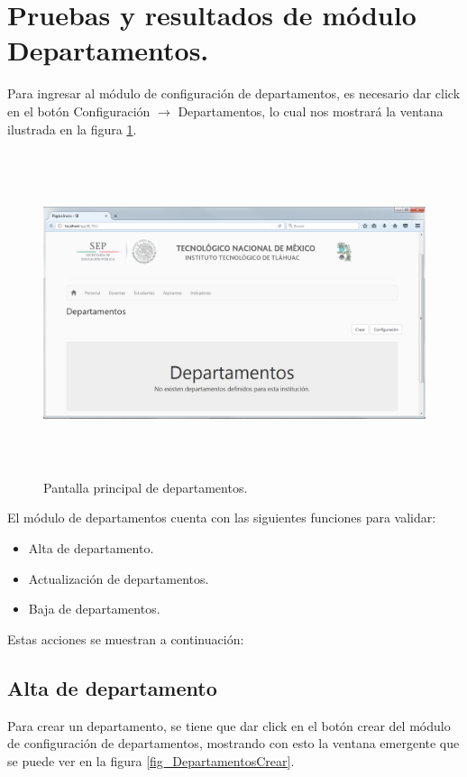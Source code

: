 		\section{Pruebas y resultados de m\'odulo Departamentos.}

			Para ingresar al m\'odulo de configuraci\'on de departamentos, es necesario dar click en el bot\'on Configuraci\'on $\rightarrow$  Departamentos, lo cual nos mostrar\'a la ventana ilustrada en la figura \ref{fig_Departamentos}.

			\begin{figure}[H]
		        \centering
		        \includegraphics[width=16cm, height=9.5cm]{figuras/Departamentos}
		        \caption{Pantalla principal de departamentos.}
		        \label{fig_Departamentos}
		    \end{figure}

			El m\'odulo de departamentos cuenta con las siguientes funciones para validar:
			\begin{itemize}
				\item Alta de departamento.
				\item Actualizaci\'on de departamentos.
				\item Baja de departamentos.
			\end{itemize}

			Estas acciones se muestran a continuaci\'on:

			\subsection{Alta de departamento}

			Para crear un departamento, se tiene que dar click en el bot\'on crear del m\'odulo de configuraci\'on de departamentos, mostrando con esto la ventana emergente  que se puede ver en la figura \ref{fig_DepartamentosCrear}.

